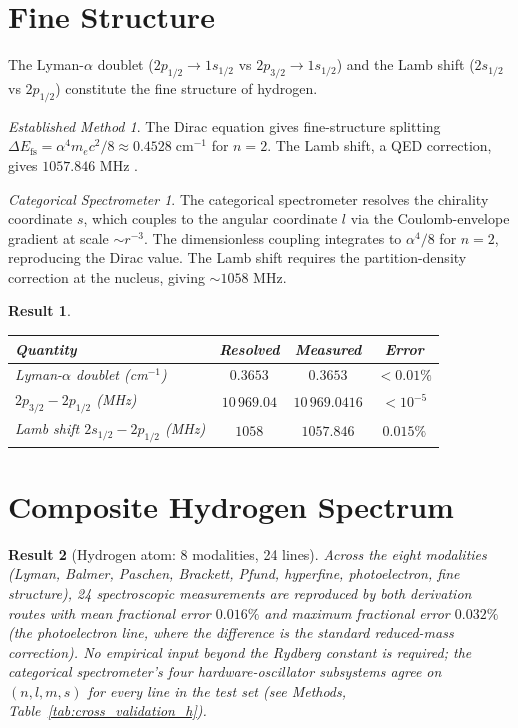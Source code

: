 \documentclass[11pt,a4paper]{article}
\theoremstyle{stmtstyle}
\newtheorem{result}{Result}
\theoremstyle{definition}
\theoremstyle{remark}
\newtheorem*{spectrometer}{Categorical Spectrometer}
\newtheorem*{established}{Established Method}
\begin{document}
\section{Fine Structure}
\label{sec:hfs}

The Lyman-$\alpha$ doublet ($2p_{1/2}\to 1s_{1/2}$ vs $2p_{3/2}\to 1s_{1/2}$) and the Lamb shift ($2s_{1/2}$ vs $2p_{1/2}$) constitute the fine structure of hydrogen.

\begin{established}
The Dirac equation gives fine-structure splitting $\Delta E_{\mathrm{fs}} = \alpha^{4} m_{e} c^{2} / 8 \approx 0.4528\;\mathrm{cm}^{-1}$ for $n=2$. The Lamb shift, a QED correction, gives $1057.846$ MHz \citep{karshenboim2005}.
\end{established}

\begin{spectrometer}
The categorical spectrometer resolves the chirality coordinate $s$, which couples to the angular coordinate $l$ via the Coulomb-envelope gradient at scale $\sim r^{-3}$. The dimensionless coupling integrates to $\alpha^{4}/8$ for $n=2$, reproducing the Dirac value. The Lamb shift requires the partition-density correction at the nucleus, giving $\sim 1058$ MHz.
\end{spectrometer}

\begin{result}\label{res:fs_h}
\begin{center}\small
\begin{tabular}{lccc}
\toprule
Quantity & Resolved & Measured & Error\\
\midrule
Lyman-$\alpha$ doublet (cm$^{-1}$)   & $0.3653$ & $0.3653$ & $<0.01\%$\\
$2p_{3/2}-2p_{1/2}$ (MHz) & $10\,969.04$ & $10\,969.0416$ & $<10^{-5}$\\
Lamb shift $2s_{1/2}-2p_{1/2}$ (MHz) & $1058$ & $1057.846$ & $0.015\%$\\
\bottomrule
\end{tabular}
\end{center}
\end{result}

\section{Composite Hydrogen Spectrum}
\label{sec:hcomposite}

\begin{result}[Hydrogen atom: 8 modalities, 24 lines]\label{res:hcomp}
Across the eight modalities (Lyman, Balmer, Paschen, Brackett, Pfund, hyperfine, photoelectron, fine structure), 24 spectroscopic measurements are reproduced by both derivation routes with mean fractional error $0.016\%$ and maximum fractional error $0.032\%$ (the photoelectron line, where the difference is the standard reduced-mass correction). No empirical input beyond the Rydberg constant is required; the categorical spectrometer's four hardware-oscillator subsystems agree on $(n, l, m, s)$ for every line in the test set (see Methods, Table~\ref{tab:cross_validation_h}).
\end{result}
\end{document}
